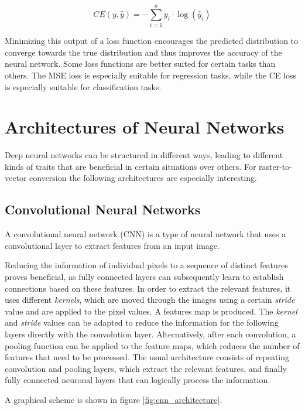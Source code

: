 \documentclass[12pt, a4paper, titlepage]{report}
\begin{document}
\[
   CE(y, \hat{y}) = -\sum_{i=1}^{n} y_i \cdot \log(\hat{y}_i)
\]


Minimizing this output of a loss function encourages the predicted distribution to converge towards the true distribution and thus improves the accuracy of the neural network.
Some loss functions are better suited for certain tasks than others. The MSE loss is especially suitable for regression tasks, while the CE loss is especially suitable for classification tasks.


\section{Architectures of Neural Networks}

Deep neural networks can be structured in different ways, leading to different kinds of traits that are beneficial in certain situations over others. For raster-to-vector conversion the following architectures are especially interesting.


\subsection{Convolutional Neural Networks}

A convolutional neural network (CNN) is a type of neural network that uses a convolutional layer to extract features from an input image. 

Reducing the information of individual pixels to a sequence of distinct features proves beneficial, as fully connected layers can subsequently learn to establish connections based on these features. In order to extract the relevant features, it uses different \emph{kernels}, which are moved through the images using a certain \emph{stride} value and are applied to the pixel values. A features map is produced. The \emph{kernel} and \emph{stride} values can be adapted to reduce the information for the following layers directly with the convolution layer.
Alternatively, after each convolution, a pooling function can be applied to the feature maps, which reduces the number of features that need to be processed. The usual architecture consists of repeating convolution and pooling layers, which extract the relevant features, and finally fully connected neuronal layers that can logically process the information.

A graphical scheme is shown in figure \ref{fig:cnn_architecture}.
\end{document}
